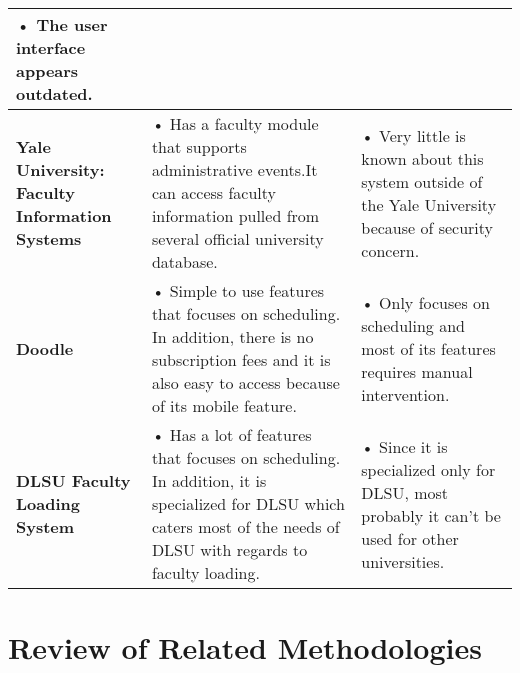 \begin{table}
\begin{tabular}{p{1.5in} | p{2in} | p{2in}}
• The user interface appears outdated.                \\ \hline
\textbf{Yale University: Faculty Information Systems}                  & 
• Has a faculty module that supports administrative events.It can access faculty information pulled from several official university database.                                                                                                                                          & • Very little is known about this system outside of the Yale University because of security concern. \\
\hline
\textbf{Doodle}                  & 
• Simple to use features that focuses on scheduling. In addition, there is no subscription fees and it is also easy to access because of its mobile feature.                                                                                                                                          & • Only focuses on scheduling and most of its features requires manual intervention. \\
\hline

\textbf{DLSU Faculty Loading System}                  & 
• Has a lot of features that focuses on scheduling. In addition, it is specialized for DLSU which caters most of the needs of DLSU with regards to faculty loading.                                                                                                                              & • Since it is specialized only for DLSU, most probably it can't be used for other universities.\\
\hline

\end{tabular}
\end{table}

\clearpage

\section{Review of Related Methodologies}

